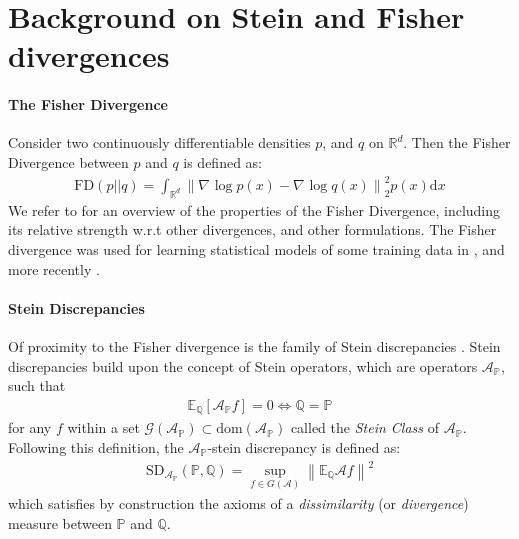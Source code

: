 \documentclass{uai2023} %
\begin{document}
\section{Background on Stein and Fisher divergences} \label{app-sec:background-divergences}

\paragraph{The Fisher Divergence} 
Consider two continuously differentiable densities $ p $, and $ q $ on  $ \mathbb{R}^d $. Then the Fisher Divergence \cite{sriperumbudur2017density,johnson2004information} between $ p $ and $ q $ is defined as:
\begin{equation*} 
\begin{aligned}
\text{FD}(p||q) = \int_{ \mathbb{R}^d }^{  } \left \| \nabla_{  } \log p(x) - \nabla_{  } \log q(x) \right \|_{2}^{2} p(x) \text{d}x
\end{aligned}
\end{equation*}
We refer to \cite{sriperumbudur2017density} for an overview of the properties
of the Fisher Divergence, including its relative strength w.r.t other
divergences, and other formulations. The Fisher divergence was used for
learning statistical models of some training data in
\cite{hyvarinen2005estimation, sriperumbudur2017density}, and more recently
\cite{song2019generative}.

\paragraph{Stein Discrepancies} 

Of proximity to the Fisher divergence is the family of
Stein discrepancies \cite{anastasiou2022stein}. Stein discrepancies
build upon the concept of Stein operators, which are operators $ \mathcal  A_{\mathbb{ P }} $,
such that
\begin{equation*} 
\begin{aligned}
\mathbb{E}_{ \mathbb{ Q } }\left [ \mathcal  A_{\mathbb P} f \right ]  = 0 \iff \mathbb{ Q } = \mathbb{ P }
\end{aligned}
\end{equation*}
for any $ f $ within a set $ \mathcal  G(\mathcal  A_{\mathbb{ P }}) \subset \textrm{dom}(\mathcal A_{\mathbb P}) $ called the \emph{Stein Class}
of $ \mathcal  A_{\mathbb P} $. Following this definition, the $ \mathcal  A_{\mathbb{ P }} $-stein discrepancy is defined as:
\begin{equation*} 
\begin{aligned}
\text{SD}_{\mathcal  A_{\mathbb{ P }}}(\mathbb{ P }, \mathbb{ Q }) = \sup_{ f \in G(\mathcal  A) }\left \|\mathbb{E}_{ \mathbb{ Q } }  \mathcal  A f \right \|^2
\end{aligned}
\end{equation*}
which satisfies by construction the axioms of a \emph{dissimilarity} (or
\emph{divergence}) measure between $ \mathbb{ P } $ and $ \mathbb{ Q } $.
\end{document}
